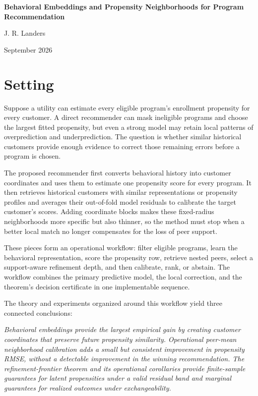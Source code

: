 \documentclass[11pt]{article}
\theoremstyle{noteplain}
\theoremstyle{definition}
\begin{document}
\begin{center}
  {\LARGE\bfseries Behavioral Embeddings and Propensity Neighborhoods for Program Recommendation\par}
  \vspace{0.7em}
  {\large J. R. Landers\,\par}
  \vspace{0.12em}
  {\small September 2026}
\end{center}

\vspace{0.05em}
\section{Setting}

Suppose a utility can estimate every eligible program's enrollment propensity for every customer. A direct recommender can mask ineligible programs and choose the largest fitted propensity, but even a strong model may retain local patterns of overprediction and underprediction. The question is whether similar historical customers provide enough evidence to correct those remaining errors before a program is chosen.

The proposed recommender first converts behavioral history into customer coordinates and uses them to estimate one propensity score for every program. It then retrieves historical customers with similar representations or propensity profiles and averages their out-of-fold model residuals to calibrate the target customer's scores. Adding coordinate blocks makes these fixed-radius neighborhoods more specific but also thinner, so the method must stop when a better local match no longer compensates for the loss of peer support.

These pieces form an operational workflow: filter eligible programs, learn the behavioral representation, score the propensity row, retrieve nested peers, select a support-aware refinement depth, and then calibrate, rank, or abstain. The workflow combines the primary predictive model, the local correction, and the theorem's decision certificate in one implementable sequence.

The theory and experiments organized around this workflow yield three connected conclusions:

\begin{center}
\emph{Behavioral embeddings provide the largest empirical gain by creating customer coordinates that preserve future propensity similarity. Operational peer-mean neighborhood calibration adds a small but consistent improvement in propensity RMSE, without a detectable improvement in the winning recommendation. The refinement-frontier theorem and its operational corollaries provide finite-sample guarantees for latent propensities under a valid residual band and marginal guarantees for realized outcomes under exchangeability.}
\end{center}
\end{document}
